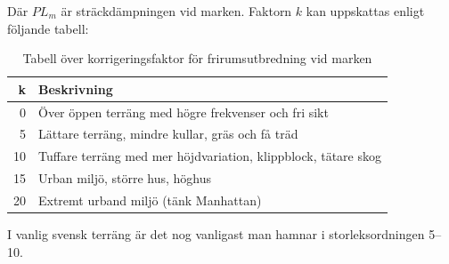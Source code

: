 Där $PL_m$ är sträckdämpningen vid marken. Faktorn $k$ kan uppskattas enligt
följande tabell:

\begin{table}[H]
	\begin{centering}
		\begin{tabular}{r|l}
			\textbf{k} & \textbf{Beskrivning} \\ \hline
			0 & Över öppen terräng med högre frekvenser och fri sikt\\
			5 & Lättare terräng, mindre kullar, gräs och få träd \\
			10 & Tuffare terräng med mer höjdvariation, klippblock, tätare skog \\
			15 & Urban miljö, större hus, höghus \\
			20 & Extremt urband miljö (tänk Manhattan)\\
		\end{tabular}
	\end{centering}
	\label{tab:frirum-faktor}
	\caption{Tabell över korrigeringsfaktor för frirumsutbredning vid marken}
\end{table}

I vanlig svensk terräng är det nog vanligast man hamnar i storleksordningen
5--10.


